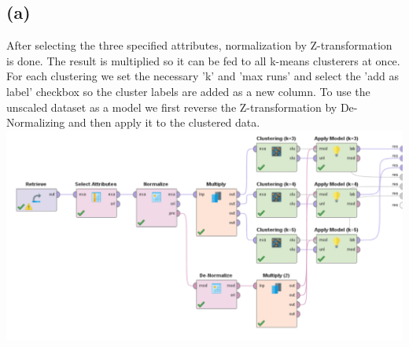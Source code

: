 \documentclass[../../main.tex]{subfiles}
\begin{document}
\subsection*{(a)}
After selecting the three specified attributes, normalization by Z-transformation is done. The result is multiplied so it can be fed to all k-means clusterers at once. For each clustering we set the necessary 'k' and 'max runs' and select the 'add as label' checkbox so the cluster labels are added as a new column. To use the unscaled dataset as a model we first reverse the Z-transformation by De-Normalizing and then apply it to the clustered data.\\  
\includegraphics[width=\textwidth]{img/QUESTION_3a_PROCESS.png}
\end{document}
